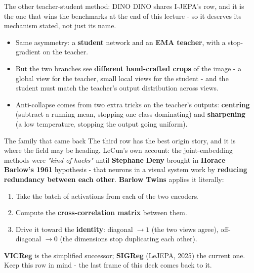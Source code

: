 \documentclass[aspectratio=169]{beamer}
\begin{document}
\begin{frame}{The other teacher-student method: DINO}
  \small
  DINO shares I-JEPA's row, and it is the one that wins the benchmarks at the end of this
  lecture - so it deserves its mechanism stated, not just its name.
  \vskip 8pt
  \begin{itemize}\small
    \item Same asymmetry: a \textbf{student} network and an \textbf{EMA teacher}, with a
      stop-gradient on the teacher.
    \item But the two branches see \textbf{different hand-crafted crops} of the image - a
      global view for the teacher, small local views for the student - and the student must
      match the teacher's output distribution across views.
    \item Anti-collapse comes from two extra tricks on the teacher's outputs:
      \textbf{centring} (subtract a running mean, stopping one class dominating) and
      \textbf{sharpening} (a low temperature, stopping the output going uniform).
  \end{itemize}
  \vskip 6pt
  \begin{center}
  \end{center}
\end{frame}

\begin{frame}{The family that came back}
  \small
  The third row has the best origin story, and it is where the field may be heading.
  \vskip 6pt
  LeCun's own account: the joint-embedding methods were \emph{"kind of hacks"} until
  \textbf{Stephane Deny} brought in \textbf{Horace Barlow's 1961} hypothesis - that
  neurons in a visual system work by \textbf{reducing redundancy between each other}.
  \vskip 8pt
  \textbf{Barlow Twins} applies it literally:
  \begin{enumerate}\small
    \item Take the batch of activations from each of the two encoders.
    \item Compute the \textbf{cross-correlation matrix} between them.
    \item Drive it toward the \textbf{identity}: diagonal $\rightarrow 1$ (the two views
      agree), off-diagonal $\rightarrow 0$ (the dimensions stop duplicating each other).
  \end{enumerate}
  \vskip 6pt
  \footnotesize
  \textbf{VICReg} is the simplified successor; \textbf{SIGReg} (LeJEPA, 2025) the current
  one. Keep this row in mind - the last frame of this deck comes back to it.
\end{frame}
\end{document}
